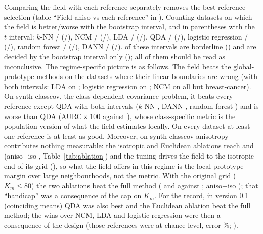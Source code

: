 \documentclass[10pt,a4paper]{article}
\theoremstyle{plain}
\theoremstyle{definition}
\theoremstyle{remark}
\begin{document}
Comparing the field with each reference separately removes the best-reference selection (table ``Field-aniso vs each reference'' in ). Counting datasets on which the field is better/worse with the bootstrap interval, and in parentheses with the $t$ interval: $k$-NN \VsRefKnnBetter/\VsRefKnnWorse{} (\VsRefKnnBetterT/\VsRefKnnWorseT), NCM \VsRefNcmBetter/\VsRefNcmWorse{} (\VsRefNcmBetterT/\VsRefNcmWorseT), LDA \VsRefLdaBetter/\VsRefLdaWorse{} (\VsRefLdaBetterT/\VsRefLdaWorseT), QDA \VsRefQdaBetter/\VsRefQdaWorse{} (\VsRefQdaBetterT/\VsRefQdaWorseT), logistic regression \VsRefLogregBetter/\VsRefLogregWorse{} (\VsRefLogregBetterT/\VsRefLogregWorseT), random forest \VsRefRforestBetter/\VsRefRforestWorse{} (\VsRefRforestBetterT/\VsRefRforestWorseT), DANN \VsRefDannBetter/\VsRefDannWorse{} (\VsRefDannBetterT/\VsRefDannWorseT). \VsRefBorderN{} of these \NVsRefCells{} intervals are borderline (\VsRefBorderList) and \VsRefBootOnlyN{} are decided by the bootstrap interval only (\VsRefBootOnlyList); all of them should be read as inconclusive.
The regime-specific picture is as follows. The field beats the global-prototype methods on the datasets where their linear boundaries are wrong (with both intervals: LDA on \VsRefLdaBetterListT; logistic regression on \VsRefLogregBetterListT; NCM on all but breast-cancer). On synth-classcov, the class-dependent-covariance problem, it beats every reference except QDA with both intervals ($k$-NN \VsCcovKnn, DANN \VsCcovDann, random forest \VsCcovRforest) and is worse than QDA (AURC${}\times100$ \AurcCcovQda{} against \AurcCcovFaniso), whose class-specific metric is the population version of what the field estimates locally. On every dataset at least one reference is at least as good. Moreover, on synth-classcov anisotropy contributes nothing measurable: the isotropic and Euclidean ablations reach \AurcCcovFiso{} and \AurcCcovFeuclid{} (aniso$-$iso \AblAnisoIsoCcov, Table~\ref{tab:ablation}) and the tuning drives the field to the isotropic end of its grid (\SelCcov), so what the field offers in this regime is the local-prototype margin over large neighbourhoods, not the metric. With the original grid ($K_m\le80$) the two ablations beat the full method (\VTwoAurcCcovFiso{} and \VTwoAurcCcovFeuclid{} against \VTwoAurcCcovFaniso; aniso$-$iso \VTwoAblAnisoIsoCcov); that ``handicap'' was a consequence of the cap on $K_m$. For the record, in version 0.1 (coinciding means) QDA was also best and the Euclidean ablation beat the full method; the wins over NCM, LDA and logistic regression were then a consequence of the design (those references were at chance level, error \VOneErrCcovLda\%; ).
\end{document}

